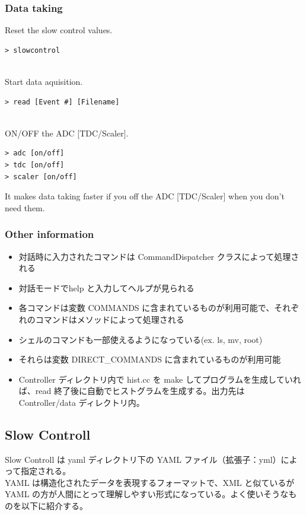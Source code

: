 \subsubsection{Data taking}
Reset the slow control values.
\begin{shadebox}
\begin{verbatim}
> slowcontrol
\end{verbatim}
\end{shadebox}
　\\
Start data aquisition.
\begin{shadebox}
\begin{verbatim}
> read [Event #] [Filename]
\end{verbatim}
\end{shadebox}
　\\
ON/OFF the ADC [TDC/Scaler].
\begin{shadebox}
\begin{verbatim}
> adc [on/off]
> tdc [on/off]
> scaler [on/off]
\end{verbatim}
\end{shadebox}
It makes data taking faster if you off the ADC [TDC/Scaler] when you don't need them.

\subsubsection{Other information}
\begin{itemize}
\item 対話時に入力されたコマンドは CommandDispatcher クラスによって処理される
\item 対話モードでhelp と入力してヘルプが見られる
\item 各コマンドは変数 COMMANDS に含まれているものが利用可能で、それぞれのコマンドはメソッドによって処理される
\item シェルのコマンドも一部使えるようになっている(ex. ls, mv, root)
\item それらは変数 DIRECT\_COMMANDS に含まれているものが利用可能
\item Controller ディレクトリ内で hist.cc を make してプログラムを生成していれば、read 終了後に自動でヒストグラムを生成する。出力先は Controller/data ディレクトリ内。
\end{itemize}

\newpage
\subsection{Slow Controll}
Slow Controll は yaml ディレクトリ下の YAML ファイル（拡張子：yml）によって指定される。\\
YAML は構造化されたデータを表現するフォーマットで、XML と似ているが YAML の方が人間にとって理解しやすい形式になっている。よく使いそうなものを以下に紹介する。


